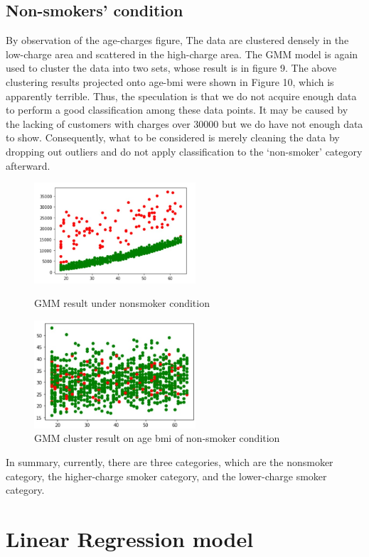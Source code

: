 \documentclass[12pt,a4paper]{article}
\begin{document}
\subsection{Non-smokers' condition}
By observation of the age-charges figure, The data are clustered densely in the low-charge area and scattered in the high-charge area. The GMM model is again used to cluster the data into two sets, whose result is in figure 9. The above clustering results projected onto age-bmi were shown in Figure 10, which is apparently terrible. Thus, the speculation is that we do not acquire enough data to perform a good classification among these data points. It may be caused by the lacking of customers with charges over 30000 but we do have not enough data to show. Consequently, what to be considered is merely cleaning the data by dropping out outliers and do not apply classification to the ‘non-smoker’ category afterward. 

\begin{figure}[H]
\centering
\begin{minipage}[t]{0.48\textwidth}
\centering
\includegraphics[width=6cm]{GMM RESULT with nonsmoker.jpg}
\caption{GMM result under nonsmoker condition}
\end{minipage}
\begin{minipage}[t]{0.48\textwidth}
\centering
\includegraphics[width=6cm]{SVM2.jpg}
\caption{GMM cluster result on age bmi of non-smoker condition}
\end{minipage}
\end{figure}
In summary, currently, there are three categories, which are the nonsmoker category, the higher-charge smoker category, and the lower-charge smoker category.
\section{Linear Regression model}
\end{document}
